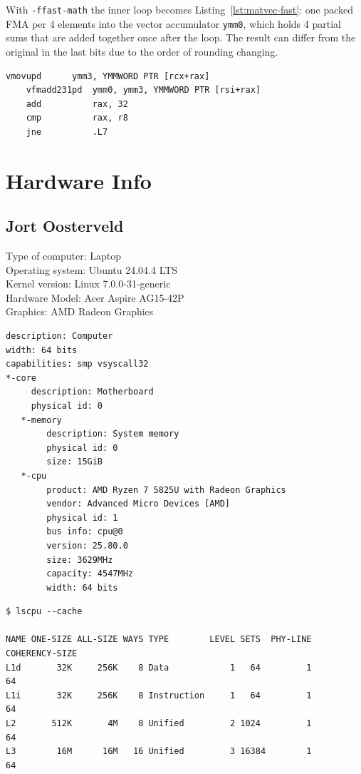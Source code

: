 \documentclass[a4paper,11pt]{article}
\begin{document}
With \texttt{-ffast-math} the inner loop becomes Listing~\ref{lst:matvec-fast}: one packed FMA per 4
elements into the vector accumulator \texttt{ymm0}, which holds 4 partial
sums that are added together once after the loop. The result can differ from
the original in the last bits due to the order of rounding changing.

\begin{lstlisting}[language={}, caption={Inner loop of \texttt{matvec} with \texttt{-O3 -march=native -ffast-math} (from \texttt{objdump}).}, label={lst:matvec-fast}]
    vmovupd      ymm3, YMMWORD PTR [rcx+rax]
    vfmadd231pd  ymm0, ymm3, YMMWORD PTR [rsi+rax]
    add          rax, 32
    cmp          rax, r8
    jne          .L7
\end{lstlisting}


\newpage
\section{Hardware Info}
\label{section:hardware_info}

\subsection{Jort Oosterveld}

Type of computer: Laptop \\
Operating system: Ubuntu 24.04.4 LTS \\
Kernel version: Linux 7.0.0-31-generic \\
Hardware Model: Acer Aspire AG15-42P \\
Graphics: AMD Radeon Graphics

\begin{lstlisting}[caption=From lshw]
description: Computer
width: 64 bits
capabilities: smp vsyscall32
*-core
     description: Motherboard
     physical id: 0
   *-memory
        description: System memory
        physical id: 0
        size: 15GiB
   *-cpu
        product: AMD Ryzen 7 5825U with Radeon Graphics
        vendor: Advanced Micro Devices [AMD]
        physical id: 1
        bus info: cpu@0
        version: 25.80.0
        size: 3629MHz
        capacity: 4547MHz
        width: 64 bits
\end{lstlisting}

\begin{lstlisting}[caption=From lscpu]
$ lscpu --cache

NAME ONE-SIZE ALL-SIZE WAYS TYPE        LEVEL SETS  PHY-LINE COHERENCY-SIZE
L1d       32K     256K    8 Data            1   64         1             64
L1i       32K     256K    8 Instruction     1   64         1             64
L2       512K       4M    8 Unified         2 1024         1             64
L3        16M      16M   16 Unified         3 16384        1             64
\end{lstlisting}
\end{document}
